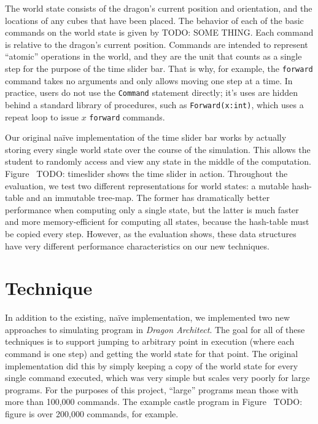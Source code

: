\documentclass{sig-alternate}
\newcommand{\da}{\emph{Dragon Architect}}
\newcommand{\todo}[1]{{\color{red} TODO: #1}}
\begin{document}
The world state consists of the dragon's current position and orientation, and the locations of any cubes that have been placed.  The behavior of each of the basic commands on the world state is given by \todo{SOME THING}. Each command is relative to the dragon's current position. Commands are intended to represent ``atomic'' operations in the world, and they are the unit that counts as a single step for the purpose of the time slider bar. That is why, for example, the \texttt{forward} command takes no arguments and only allows moving one step at a time. In practice, users do not use the \texttt{Command} statement directly; it's uses are hidden behind a standard library of procedures, such as \texttt{Forward(x:int)}, which uses a repeat loop to issue $x$ \texttt{forward} commands.

Our original na\"{i}ve implementation of the time slider bar works by actually storing every single world state over the course of the simulation. This allows the student to randomly access and view any state in the middle of the computation. Figure~\todo{timeslider} shows the time slider in action. Throughout the evaluation, we test two different representations for world states: a mutable hash-table and an immutable tree-map. The former has dramatically better performance when computing only a single state, but the latter is much faster and more memory-efficient for computing all states, because the hash-table must be copied every step. However, as the evaluation shows, these data structures have very different performance characteristics on our new techniques.

\section{Technique} 

In addition to the existing, na\"{i}ve implementation, we implemented two new approaches to simulating program in \da. The goal for all of these techniques is to support jumping to arbitrary point in execution (where each command is one step) and getting the world state for that point. The original implementation did this by simply keeping a copy of the world state for every single command executed, which was very simple but scales very poorly for large programs. For the purposes of this project, ``large'' programs mean those with more than 100,000 commands. The example castle program in Figure~\todo{figure} is over 200,000 commands, for example.
\end{document}
